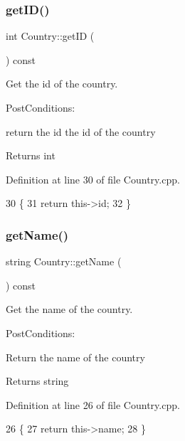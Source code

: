 \subsubsection{\texorpdfstring{get\+I\+D()}{getID()}}
{\footnotesize\ttfamily int Country\+::get\+ID (\begin{DoxyParamCaption}{ }\end{DoxyParamCaption}) const}



Get the id of the country. 

Post\+Conditions\+:
\begin{DoxyItemize}
\item return the id the id of the country
\end{DoxyItemize}

\begin{DoxyReturn}{Returns}
int 
\end{DoxyReturn}


Definition at line 30 of file Country.\+cpp.


\begin{DoxyCode}
30                         \{
31     \textcolor{keywordflow}{return} this->id;
32 \}
\end{DoxyCode}
\mbox{\label{classCountry_af86e64cecec9c266dbf284329ab072f3}} 
\subsubsection{\texorpdfstring{get\+Name()}{getName()}}
{\footnotesize\ttfamily string Country\+::get\+Name (\begin{DoxyParamCaption}{ }\end{DoxyParamCaption}) const}



Get the name of the country. 

Post\+Conditions\+:
\begin{DoxyItemize}
\item Return the name of the country
\end{DoxyItemize}

\begin{DoxyReturn}{Returns}
string 
\end{DoxyReturn}


Definition at line 26 of file Country.\+cpp.


\begin{DoxyCode}
26                              \{
27     \textcolor{keywordflow}{return} this->name;
28 \}
\end{DoxyCode}
\mbox{\label{classCountry_a35ecd0419e6a6eaf358889527c280d82}} 
